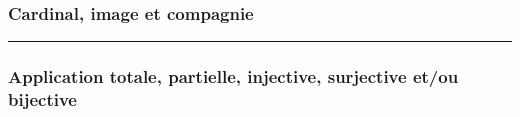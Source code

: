 \documentclass[12pt,a4paper]{article}
\theoremstyle{definition}
\newcommand\separation{
	\medskip
	\hfill\rule{0.5\textwidth}{0.75pt}\hfill
	\medskip
}
\begin{document}
\subsubsection{Cardinal, image et compagnie}




\separation




\subsubsection{Application totale, partielle, injective, surjective et/ou bijective}

\vspace{-.75em}
\begin{multicols}{2}
    
    
    
    
    
    
    
\end{multicols}
\newpage
\end{document}
